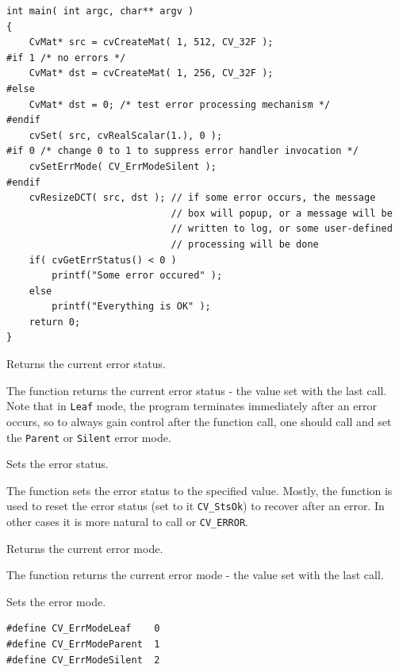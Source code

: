\begin{lstlisting}
int main( int argc, char** argv )
{
    CvMat* src = cvCreateMat( 1, 512, CV_32F );
#if 1 /* no errors */
    CvMat* dst = cvCreateMat( 1, 256, CV_32F );
#else
    CvMat* dst = 0; /* test error processing mechanism */
#endif
    cvSet( src, cvRealScalar(1.), 0 );
#if 0 /* change 0 to 1 to suppress error handler invocation */
    cvSetErrMode( CV_ErrModeSilent );
#endif
    cvResizeDCT( src, dst ); // if some error occurs, the message
                             // box will popup, or a message will be
                             // written to log, or some user-defined
                             // processing will be done
    if( cvGetErrStatus() < 0 )
        printf("Some error occured" );
    else
        printf("Everything is OK" );
    return 0;
}
\end{lstlisting}

Returns the current error status.


The function returns the current error status -
the value set with the last  call. Note that in
\texttt{Leaf} mode, the program terminates immediately after an
error occurs, so to always gain control after the function call,
one should call  and set the \texttt{Parent}
or \texttt{Silent} error mode.

Sets the error status.


\begin{description}
\end{description}

The function sets the error status to the specified value. Mostly, the function is used to reset the error status (set to it \texttt{CV\_StsOk}) to recover after an error. In other cases it is more natural to call  or \texttt{CV\_ERROR}.

Returns the current error mode.


The function returns the current error mode - the value set with the last  call.

Sets the error mode.

\begin{lstlisting}
#define CV_ErrModeLeaf    0
#define CV_ErrModeParent  1
#define CV_ErrModeSilent  2
\end{lstlisting}

